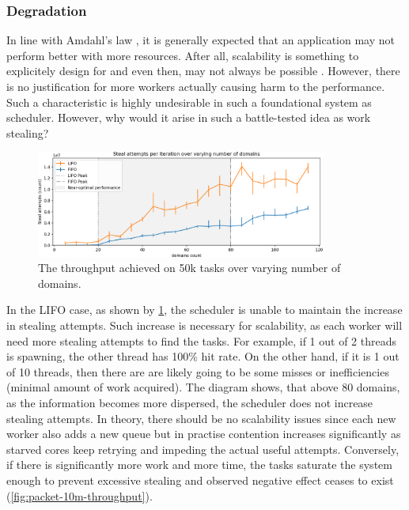 \documentclass[12pt,a4paper,twoside]{report}
\begin{document}
\subsubsection{Degradation}
\label{section:degradation}
In line with Amdahl's law \cite{amdahl}, it is generally expected that an application may not perform better with more resources. After all, scalability is something to explicitely design for and even then, may not always be possible . However, there is no justification for more workers actually causing harm to the performance. Such a characteristic is highly undesirable in such a foundational system as scheduler. However, why would it arise in such a battle-tested idea as work stealing? 

\begin{figure} 
     \centering
     \includegraphics[width=0.85\textwidth]{eval/packet-basic-with-steal-counts2.png}
     \caption{The throughput achieved on 50k tasks over varying number of domains.}
    \label{fig:packet-with-steal-counts}
\end{figure}

In the LIFO case, as shown by \ref{fig:packet-with-steal-counts}, the scheduler is unable to maintain the increase in stealing attempts. Such increase is necessary for scalability, as each worker will need more stealing attempts to find the tasks. For example, if 1 out of 2 threads is spawning, the other thread has 100\% hit rate. On the other hand, if it is 1 out of 10 threads, then there are are likely going to be some misses or inefficiencies (minimal amount of work acquired). The diagram shows, that above 80 domains, as the information becomes more dispersed, the scheduler does not increase stealing attempts. In theory, there should be no scalability issues since each new worker also adds a new queue but in practise contention increases significantly as starved cores keep retrying and impeding the actual useful attempts. Conversely, if there is significantly more work and more time, the tasks saturate the system enough to prevent excessive stealing and observed negative effect ceases to exist (\ref{fig:packet-10m-throughput}).
\end{document}
